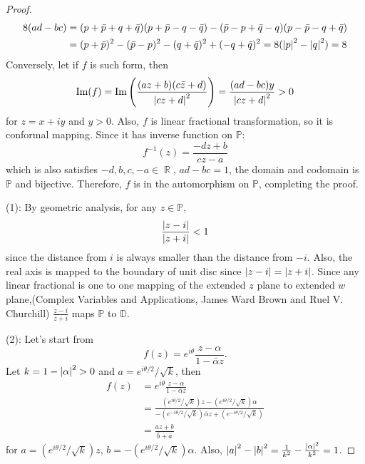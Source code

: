 \documentclass{article}
\DeclareMathOperator{\rr}{\mathbb{R}}
\begin{document}
\begin{enumerate}
\begin{proof}
\begin{equation*}
\begin{split}
8(ad-bc)&=(p+\bar{p}+q+\bar{q})(p+\bar{p}-q-\bar{q})-(\bar{p}-p+\bar{q}-q)(p-\bar{p}-q+\bar{q}) \\
&=(p+\bar{p})^2-(\bar{p}-p)^2-(q+\bar{q})^2+(-q+\bar{q})^2=8(\abs{p}^2-\abs{q}^2)=8
\end{split}
\end{equation*}
Conversely, let if $f$ is such form, then
\begin{equation*}
\text{Im}(f)=\text{Im}\left(\frac{(az+b)(c\bar{z}+d)}{\abs{cz+d}^2}\right)=\frac{(ad-bc)y}{\abs{cz+d}^2}>0
\end{equation*}
for $z=x+iy$ and $y>0$. Also, $f$ is linear fractional transformation, so it is conformal mapping. Since it has inverse function on $\mathbb{P}$:
\begin{equation*}
f^{-1}(z)=\frac{-dz+b}{cz-a}
\end{equation*}
which is also satisfies $-d,b,c,-a\in \rr$, $ad-bc=1$, the domain and codomain is $\mathbb{P}$ and bijective. Therefore, $f$ is in the automorphism on $\mathbb{P}$, completing the proof.

(1): By geometric analysis, for any $z\in\mathbb{P}$,
\begin{equation*}
\frac{\abs{z-i}}{\abs{z+i}}<1
\end{equation*}
since the distance from $i$ is always smaller than the distance from $-i$. Also, the real axis is mapped to the boundary of unit disc since $\abs{z-i}=\abs{z+i}$. Since any linear fractional is one to one mapping of the extended $z$ plane to extended $w$ plane,(Complex Variables and Applications, James Ward Brown and Ruel V. Churchill) $\frac{z-i}{z+i}$ maps $\mathbb{P}$ to $\mathbb{D}$.

(2): Let's start from 
\begin{equation*}
f(z)=e^{i\theta}\frac{z-\alpha}{1-\bar{\alpha}z}.
\end{equation*}
Let $k=1-\abs{\alpha}^2>0$ and $a=e^{i\theta/2}/\sqrt{k}$, then
\begin{equation*}
\begin{split}
f(z)&=e^{i\theta}\frac{z-\alpha}{1-\bar{\alpha}z} \\
&=\frac{(e^{i\theta/2}/\sqrt{k})z-(e^{i\theta/2}/\sqrt{k})\alpha}{-(e^{-i\theta/2}/\sqrt{k})\bar{\alpha}z+(e^{-i\theta/2}/\sqrt{k})} \\
&=\frac{az+b}{\bar{b}+\bar{a}}
\end{split}
\end{equation*}
for $a=(e^{i\theta/2}/\sqrt{k})z$, $b=-(e^{i\theta/2}/\sqrt{k})\alpha$. Also, $\abs{a}^2-\abs{b}^2=\frac{1}{k^2}-\frac{\abs{\alpha}^2}{k^2}=1$.
\end{proof}
\end{enumerate}
\end{document}
